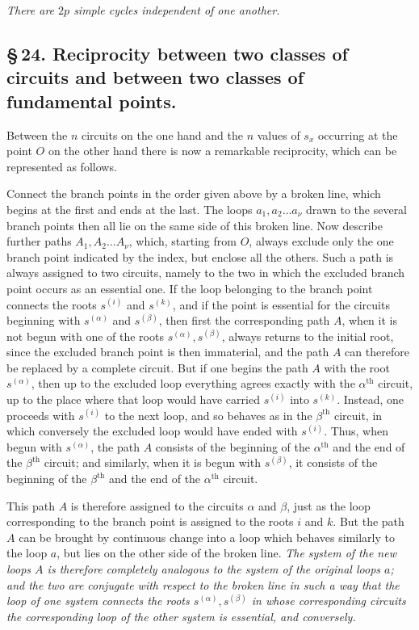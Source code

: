 \documentclass[10pt]{article}
\begin{document}
\begin{center}
\emph{There are \(2p\) simple cycles independent of one another.}
\end{center}

\subsection*{\S\,24. Reciprocity between two classes of circuits and between two classes of fundamental points.}

Between the \(n\) circuits on the one hand and the \(n\) values of \(s_x\) occurring at the point \(O\) on the other hand there is now a remarkable reciprocity, which can be represented as follows.

Connect the branch points in the order given above by a broken line, which begins at the first and ends at the last. The loops \(a_1,a_2\ldots a_{\nu}\) drawn to the several branch points then all lie on the same side of this broken line. Now describe further paths \(A_1,A_2\ldots A_{\nu}\), which, starting from \(O\), always exclude only the one branch point indicated by the index, but enclose all the others. Such a path is always assigned to two circuits, namely to the two in which the excluded branch point occurs as an essential one. If the loop belonging to the branch point connects the roots \(s^{(i)}\) and \(s^{(k)}\), and if the point is essential for the circuits beginning with \(s^{(\alpha)}\) and \(s^{(\beta)}\), then first the corresponding path \(A\), when it is not begun with one of the roots \(s^{(\alpha)},s^{(\beta)}\), always returns to the initial root, since the excluded branch point is then immaterial, and the path \(A\) can therefore be replaced by a complete circuit. But if one begins the path \(A\) with the root \(s^{(\alpha)}\), then up to the excluded loop everything agrees exactly with the \(\alpha^{\text{th}}\) circuit, up to the place where that loop would have carried \(s^{(i)}\) into \(s^{(k)}\). Instead, one proceeds with \(s^{(i)}\) to the next loop, and so behaves as in the \(\beta^{\text{th}}\) circuit, in which conversely the excluded loop would have ended with \(s^{(i)}\). Thus, when begun with \(s^{(\alpha)}\), the path \(A\) consists of the beginning of the \(\alpha^{\text{th}}\) and the end of the \(\beta^{\text{th}}\) circuit; and similarly, when it is begun with \(s^{(\beta)}\), it consists of the beginning of the \(\beta^{\text{th}}\) and the end of the \(\alpha^{\text{th}}\) circuit.

This path \(A\) is therefore assigned to the circuits \(\alpha\) and \(\beta\), just as the loop corresponding to the branch point is assigned to the roots \(i\) and \(k\). But the path \(A\) can be brought by continuous change into a loop which behaves similarly to the loop \(a\), but lies on the other side of the broken line. \emph{The system of the new loops \(A\) is therefore completely analogous to the system of the original loops \(a\); and the two are conjugate with respect to the broken line in such a way that the loop of one system connects the roots \(s^{(\alpha)},s^{(\beta)}\) in whose corresponding circuits the corresponding loop of the other system is essential, and conversely.}
\end{document}
